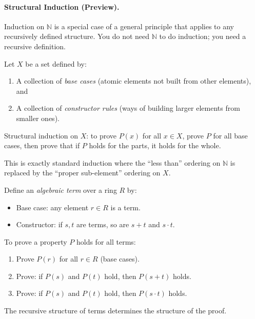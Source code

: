 \paragraph{Structural Induction (Preview).}

Induction on $\mathbb{N}$ is a special case of a general principle
that applies to any recursively defined structure. You do not need
$\mathbb{N}$ to do induction; you need a recursive definition.

\begin{remark}
Let $X$ be a set defined by:
\begin{enumerate}[itemsep=2pt]
  \item A collection of \emph{base cases} (atomic elements not built
    from other elements), and
  \item A collection of \emph{constructor rules} (ways of building
    larger elements from smaller ones).
\end{enumerate}
Structural induction on $X$: to prove $P(x)$ for all $x \in X$,
prove $P$ for all base cases, then prove that if $P$ holds for the
parts, it holds for the whole.

This is exactly standard induction where the ``less than'' ordering
on $\mathbb{N}$ is replaced by the ``proper sub-element'' ordering
on $X$.
\end{remark}

\begin{example}
Define an \emph{algebraic term} over a ring $R$ by:
\begin{itemize}[itemsep=2pt]
  \item Base case: any element $r \in R$ is a term.
  \item Constructor: if $s, t$ are terms, so are $s + t$ and $s \cdot t$.
\end{itemize}
To prove a property $P$ holds for all terms:
\begin{enumerate}[itemsep=2pt]
  \item Prove $P(r)$ for all $r \in R$ (base cases).
  \item Prove: if $P(s)$ and $P(t)$ hold, then $P(s + t)$ holds.
  \item Prove: if $P(s)$ and $P(t)$ hold, then $P(s \cdot t)$ holds.
\end{enumerate}
The recursive structure of terms determines the structure of the proof.
\end{example}

